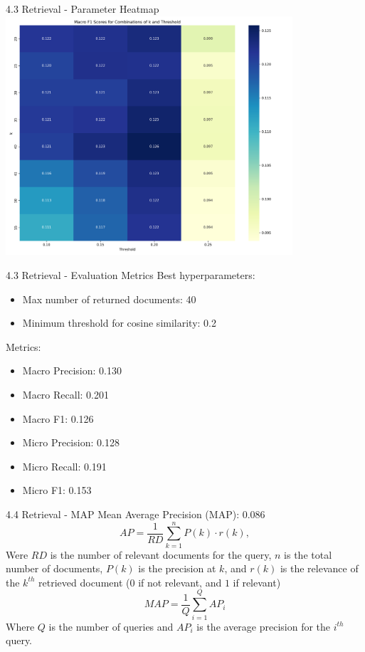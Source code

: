 \documentclass{beamer}
\begin{document}
\begin{frame}{4.3 Retrieval - Parameter Heatmap}
  \centering
  \includegraphics[width=0.8\textwidth]{ir_parameter_heatmap1747239585.png}
\end{frame}

\begin{frame}{4.3 Retrieval - Evaluation Metrics}
  Best hyperparameters:
  \begin{itemize}
    \item Max number of returned documents: 40
    \item Minimum threshold for cosine similarity: 0.2
  \end{itemize}
  Metrics:
  \begin{itemize}
    \item Macro Precision: 0.130
    \item Macro Recall: 0.201
    \item Macro F1: 0.126
    \item Micro Precision: 0.128
    \item Micro Recall: 0.191
    \item Micro F1: 0.153
  \end{itemize}
\end{frame}

\begin{frame}{4.4 Retrieval - MAP}
  Mean Average Precision (MAP): 0.086
  \begin{equation}
    AP = \frac{1}{RD} \sum_{k=1}^{n} P(k) \cdot r(k),
  \end{equation}
  Were $RD$  is the number of relevant documents for the query, $n$ is the total number of documents, $P(k)$
  is the precision at $k$, and $r(k)$ is the relevance of the $k^{th}$ retrieved document ($0$ if not relevant, and $1$ if
  relevant)
  \begin{equation}
    MAP = \frac{1}{Q} \sum_{i=1}^{Q} AP_i
  \end{equation}
  Where $Q$ is the number of queries and $AP_i$ is the average precision for the $i^{th}$ query.
\end{frame}
\end{document}
